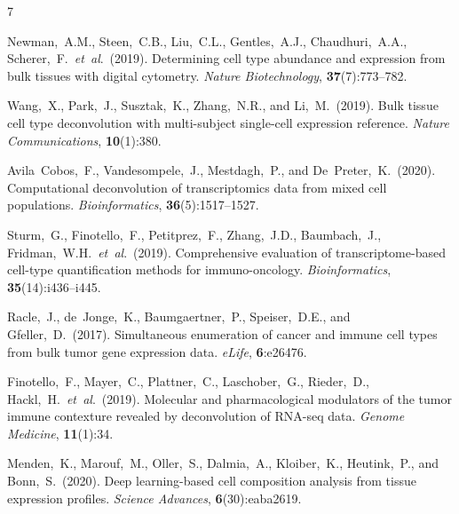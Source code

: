 \documentclass[10pt,twocolumn]{article}
\begin{document}

\begin{thebibliography}{7}

Newman,~A.M., Steen,~C.B., Liu,~C.L., Gentles,~A.J., Chaudhuri,~A.A.,
Scherer,~F.\ \textit{et~al}.\ (2019).
Determining cell type abundance and expression from bulk tissues with digital
cytometry.
\textit{Nature Biotechnology}, \textbf{37}(7):773--782.

Wang,~X., Park,~J., Susztak,~K., Zhang,~N.R., and Li,~M.\ (2019).
Bulk tissue cell type deconvolution with multi-subject single-cell expression
reference.
\textit{Nature Communications}, \textbf{10}(1):380.

Avila~Cobos,~F., Vandesompele,~J., Mestdagh,~P., and De~Preter,~K.\ (2020).
Computational deconvolution of transcriptomics data from mixed cell
populations.
\textit{Bioinformatics}, \textbf{36}(5):1517--1527.

Sturm,~G., Finotello,~F., Petitprez,~F., Zhang,~J.D., Baumbach,~J.,
Fridman,~W.H.\ \textit{et~al}.\ (2019).
Comprehensive evaluation of transcriptome-based cell-type quantification
methods for immuno-oncology.
\textit{Bioinformatics}, \textbf{35}(14):i436--i445.

Racle,~J., de~Jonge,~K., Baumgaertner,~P., Speiser,~D.E., and
Gfeller,~D.\ (2017).
Simultaneous enumeration of cancer and immune cell types from bulk tumor
gene expression data.
\textit{eLife}, \textbf{6}:e26476.

Finotello,~F., Mayer,~C., Plattner,~C., Laschober,~G., Rieder,~D.,
Hackl,~H.\ \textit{et~al}.\ (2019).
Molecular and pharmacological modulators of the tumor immune contexture
revealed by deconvolution of RNA-seq data.
\textit{Genome Medicine}, \textbf{11}(1):34.

Menden,~K., Marouf,~M., Oller,~S., Dalmia,~A., Kloiber,~K., Heutink,~P.,
and Bonn,~S.\ (2020).
Deep learning-based cell composition analysis from tissue expression profiles.
\textit{Science Advances}, \textbf{6}(30):eaba2619.

\end{thebibliography}
\end{document}
